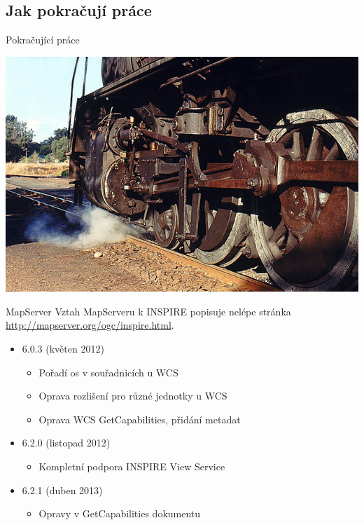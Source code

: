 \documentclass[xcolor=dvipsnames]{beamer}
\begin{document}
\subsection{Jak pokračují práce}
\begin{frame}{Pokračující práce}
    \begin{center} 
        \includegraphics[width=\textwidth]{imgs/ils/engine.jpg}
    \end{center}
\end{frame}


\begin{frame}{MapServer}
Vztah MapServeru k INSPIRE popisuje nelépe stránka
\url{http://mapserver.org/ogc/inspire.html}. 

\begin{itemize}
    \item 6.0.3 (květen 2012)
        \begin{itemize}
            \item Pořadí os v souřadnicích u WCS
            \item Oprava rozlišení pro různé jednotky u WCS
            \item Oprava WCS GetCapabilities, přidání metadat
        \end{itemize}
        \pause
    \item 6.2.0 (listopad 2012)
        \begin{itemize}
            \item Kompletní podpora INSPIRE View Service
        \end{itemize}
        \pause
    \item 6.2.1 (duben 2013)
        \begin{itemize}
            \item Opravy v GetCapabilities dokumentu
        \end{itemize}
\end{itemize}
\end{frame}
\end{document}
